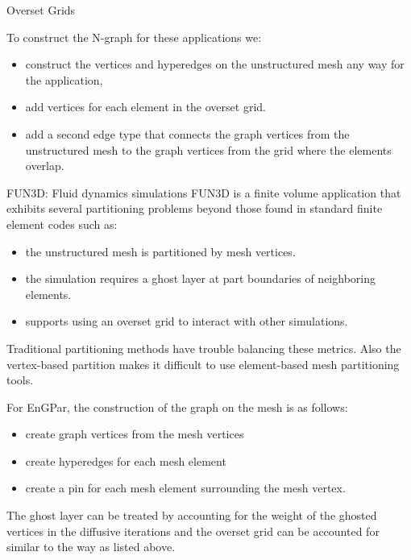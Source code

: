 \documentclass{beamer}
\begin{document}
\begin{textblock}{15.6}
\begin{textblock}{5}
\begin{block}{\centering Overset Grids}
      
      To construct the N-graph for these applications we:
      \begin{itemize}
      \item construct the vertices and hyperedges on the unstructured mesh any way for the application,
      \item add vertices for each element in the overset grid.
      \item add a second edge type that connects the graph vertices from the unstructured mesh to the graph vertices from the grid where the elements overlap.
      \end{itemize}

      
    \end{block}
    
    \begin{block}{\centering FUN3D: Fluid dynamics simulations}
      FUN3D is a finite volume application that exhibits several partitioning problems beyond those found in standard finite element codes such as:
      \begin{itemize}
      \item the unstructured mesh is partitioned by mesh vertices.
      \item the simulation requires a ghost layer at part boundaries of neighboring elements.
      \item supports using an overset grid to interact with other simulations.
      \end{itemize}

      Traditional partitioning methods have trouble balancing these metrics. Also the vertex-based partition makes it difficult to use element-based mesh partitioning tools.

      For EnGPar, the construction of the graph on the mesh is as follows:
      \begin{itemize}
      \item create graph vertices from the mesh vertices
      \item create hyperedges for each mesh element
      \item create a pin for each mesh element surrounding the mesh vertex.
      \end{itemize}
      The ghost layer can be treated by accounting for the weight of the ghosted vertices in the diffusive iterations and the overset grid can be accounted for similar to the way as listed above.

      
    \end{block}
  \end{textblock}
\end{textblock}
\end{document}
